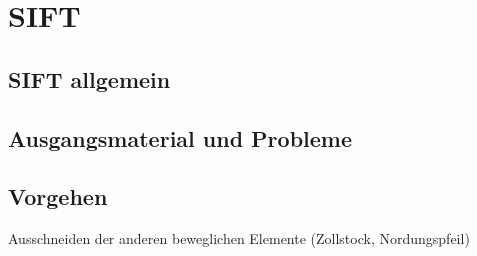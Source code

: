\section{SIFT}
\subsection{SIFT allgemein}
\subsection{Ausgangsmaterial und Probleme}
\subsection{Vorgehen}
Ausschneiden der anderen beweglichen Elemente (Zollstock, Nordungspfeil)